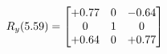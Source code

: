 \documentclass[preview]{standalone}
\begin{document}
\begin{align*}
\special{dvisvgm:raw <g id='unique000'>}R_{y}(5.59) = \begin{bmatrix}+0.77 & 0 & -0.64 \\0 & 1 & 0 \\+0.64 & 0 & +0.77\end{bmatrix}\special{dvisvgm:raw </g>}
\end{align*}
\end{document}
